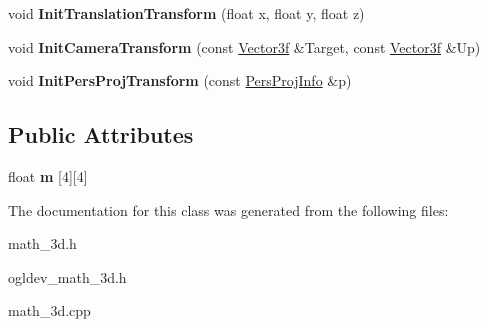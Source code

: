 \begin{DoxyCompactItemize}
\item 
\hypertarget{classMatrix4f_aebf4d72c978e7c2c5770da4b2f9b88bb}{void {\bfseries Init\-Translation\-Transform} (float x, float y, float z)}\label{classMatrix4f_aebf4d72c978e7c2c5770da4b2f9b88bb}

\item 
\hypertarget{classMatrix4f_a6e8c636a04e1fc8d81f448cd68a13aea}{void {\bfseries Init\-Camera\-Transform} (const \hyperlink{structVector3f}{Vector3f} \&Target, const \hyperlink{structVector3f}{Vector3f} \&Up)}\label{classMatrix4f_a6e8c636a04e1fc8d81f448cd68a13aea}

\item 
\hypertarget{classMatrix4f_a48064d7cf650e26623cf5371e2ef1b8b}{void {\bfseries Init\-Pers\-Proj\-Transform} (const \hyperlink{structPersProjInfo}{Pers\-Proj\-Info} \&p)}\label{classMatrix4f_a48064d7cf650e26623cf5371e2ef1b8b}

\end{DoxyCompactItemize}
\subsection*{Public Attributes}
\begin{DoxyCompactItemize}
\item 
\hypertarget{classMatrix4f_a51f2ef7cfcd591b03bc78c3a958dfd51}{float {\bfseries m} \mbox{[}4\mbox{]}\mbox{[}4\mbox{]}}\label{classMatrix4f_a51f2ef7cfcd591b03bc78c3a958dfd51}

\end{DoxyCompactItemize}


The documentation for this class was generated from the following files\-:\begin{DoxyCompactItemize}
\item 
math\-\_\-3d.\-h\item 
ogldev\-\_\-math\-\_\-3d.\-h\item 
math\-\_\-3d.\-cpp\end{DoxyCompactItemize}
